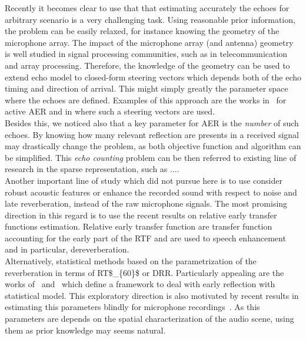 Recently it becomes clear to use that that estimating accurately the echoes for arbitrary scenario is a very challenging task.
Using reasonable prior information, the problem can be easily relaxed, for instance knowing the geometry of the microphone array.
The impact of the microphone array (and antenna) geometry is well studied in signal processing communities, such as in telecommunication and array processing.
Therefore, the knowledge of the geometry can be used to extend echo model to closed-form steering vectors which depends both of the echo timing and direction of arrival.
This might simply greatly the parameter space where the echoes are defined.
Examples of this approach are the works in~ for active \acf{AER} and in  where such a steering vectors are used.
\\Besides this, we noticed also that a key parameter for \ac{AER} is the \textit{number} of such echoes.
By knowing how many relevant reflection are presents in a received signal may drastically change the problem, as both objective function and algorithm can be simplified.
This \textit{echo counting} problem can be then referred to existing line of research in the sparse representation, such as ....
\\Another important line of study which did not pursue here is to use consider robust acoustic features or enhance the recorded sound with respect to noise and late reverberation, instead of the raw microphone signals.
The most promising direction in this regard is to use the recent results on relative early transfer functions estimation.
Relative early transfer function are transfer function accounting for the early part of the \ac{RTF} and are used to speech enhancement and in particular, dereverberation.
\\Alternatively, statistical methods based on the parametrization of the reverberation in terms of \ac{RT$_{60}$} or \acf{DRR}.
Particularly appealing are the works of~\citeauthor{leglaive2015multichannel} and~\citeauthor{badeau2019common} which define a framework to deal with early reflection with statistical model.
This exploratory direction is also motivated by recent results in estimating this parameters blindly for microphone recordings~.
As this parameters are depends on the spatial characterization of the audio scene, using them as prior knowledge may seems natural.

